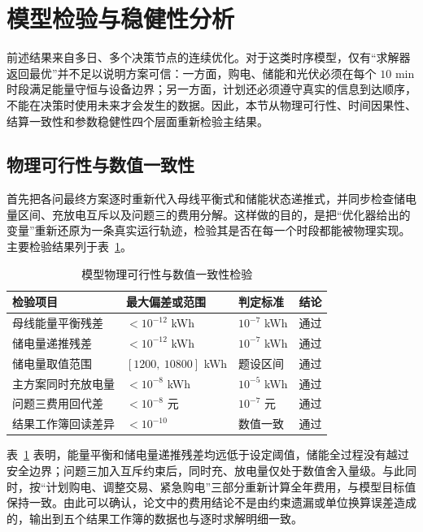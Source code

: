 \section{模型检验与稳健性分析}
\label{sec:validation}

前述结果来自多日、多个决策节点的连续优化。对于这类时序模型，仅有“求解器返回最优”并不足以说明方案可信：一方面，购电、储能和光伏必须在每个 $10$ min 时段满足能量守恒与设备边界；另一方面，计划还必须遵守真实的信息到达顺序，不能在决策时使用未来才会发生的数据。因此，本节从物理可行性、时间因果性、结算一致性和参数稳健性四个层面重新检验主结果。

\subsection{物理可行性与数值一致性}

首先把各问最终方案逐时重新代入母线平衡式和储能状态递推式，并同步检查储电量区间、充放电互斥以及问题三的费用分解。这样做的目的，是把“优化器给出的变量”重新还原为一条真实运行轨迹，检验其是否在每一个时段都能被物理实现。主要检验结果列于表~\ref{tab:validation}。

\begin{table}[htbp]
    \caption{模型物理可行性与数值一致性检验}
    \label{tab:validation}
    \centering
    \begin{tabular}{l l l l}
        \toprule
        检验项目 & 最大偏差或范围 & 判定标准 & 结论 \\
        \midrule
        母线能量平衡残差 & $<10^{-12}$ kWh & $10^{-7}$ kWh & 通过 \\
        储电量递推残差 & $<10^{-12}$ kWh & $10^{-7}$ kWh & 通过 \\
        储电量取值范围 & $[1200,\ 10800]$ kWh & 题设区间 & 通过 \\
        主方案同时充放电量 & $<10^{-8}$ kWh & $10^{-5}$ kWh & 通过 \\
        问题三费用回代差 & $<10^{-8}$ 元 & $10^{-7}$ 元 & 通过 \\
        结果工作簿回读差异 & $<10^{-10}$ & 数值一致 & 通过 \\
        \bottomrule
    \end{tabular}
\end{table}

表~\ref{tab:validation} 表明，能量平衡和储电量递推残差均远低于设定阈值，储能全过程没有越过安全边界；问题三加入互斥约束后，同时充、放电量仅处于数值舍入量级。与此同时，按“计划购电、调整交易、紧急购电”三部分重新计算全年费用，与模型目标值保持一致。由此可以确认，论文中的费用结论不是由约束遗漏或单位换算误差造成的，输出到五个结果工作簿的数据也与逐时求解明细一致。

